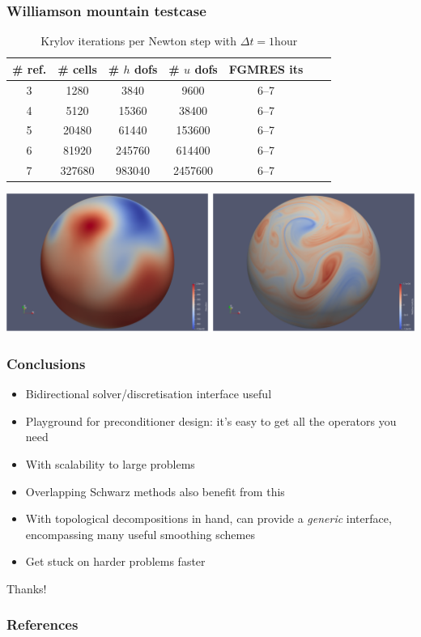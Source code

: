 \documentclass[presentation,aspectratio=43, 10pt]{beamer}
\begin{document}
\begin{frame}
  \frametitle{Williamson mountain testcase}
  \begin{table}[htbp]
    \centering
    \begin{tabular}{cc|ccccc}
      \toprule
      \# ref. & \# cells & \# $h$ dofs & \# $u$ dofs & FGMRES its\\
      \midrule
      3   & 1280 & 3840 & 9600 & 6--7\\
      4 & 5120  & 15360 & 38400 & 6--7\\
      5 & 20480 & 61440 & 153600 & 6--7\\
      6 & 81920 & 245760 & 614400 & 6--7\\
      7 & 327680 & 983040 & 2457600 & 6--7\\
      \bottomrule
    \end{tabular}
    \caption{Krylov iterations per Newton step with
      $\Delta t = 1\text{hour}$}
  \end{table}

  {\centering
    \includegraphics[height=0.4\textheight]{williamson-mountain-al}\par
    }
\end{frame}

\begin{frame}
  \frametitle{Conclusions}
  \begin{itemize}
  \item Bidirectional solver/discretisation interface useful
  \item Playground for preconditioner design: it's easy to get all the
    operators you need
  \item With scalability to large problems
  \item Overlapping Schwarz methods also benefit from this
  \item With topological decompositions in hand, can provide a
    \emph{generic} interface, encompassing many useful smoothing
    schemes
  \item Get stuck on harder problems faster
  \end{itemize}

  \begin{center}
    Thanks!
  \end{center}
\end{frame}

\appendix
\begin{frame}[allowframebreaks]
  \frametitle{References}
  \printbibliography[heading=none]
\end{frame}
\end{document}
